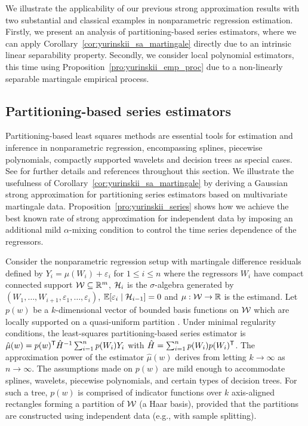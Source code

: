 We illustrate the applicability of our previous strong approximation results
with two substantial and classical examples in nonparametric regression
estimation. Firstly, we present an analysis of partitioning-based series
estimators, where we can apply Corollary~\ref{cor:yurinskii_sa_martingale}
directly due to an intrinsic linear separability property. Secondly, we
consider local polynomial estimators, this time using
Proposition~\ref{pro:yurinskii_emp_proc} due to a non-linearly separable
martingale empirical process.

\subsection{Partitioning-based series estimators}
\label{sec:yurinskii_series}

Partitioning-based least squares methods are essential tools for estimation and
inference in nonparametric regression, encompassing splines, piecewise
polynomials, compactly supported wavelets and decision trees as special cases.
See \citet{cattaneo2020large} for further details and references throughout
this section. We illustrate the usefulness of
Corollary~\ref{cor:yurinskii_sa_martingale}
by deriving a Gaussian strong approximation for partitioning series estimators
based on multivariate martingale data. Proposition~\ref{pro:yurinskii_series}
shows how
we achieve the best known rate of strong approximation for independent data by
imposing an additional mild $\alpha$-mixing condition to control the time
series dependence of the regressors.

Consider the nonparametric regression setup with martingale difference
residuals defined by $Y_i = \mu(W_i) + \varepsilon_i$ for $ 1 \leq i \leq n$
where the regressors $W_i$ have compact connected support $\mathcal{W} \subseteq \mathbb{R}^m$,
$\mathcal{H}_i$ is the $\sigma$-algebra generated by
$(W_1, \ldots, W_{i+1}, \varepsilon_1, \ldots, \varepsilon_i)$,
$\mathbb{E}[\varepsilon_i \mid \mathcal{H}_{i-1}] = 0$ and $\mu: \mathcal{W} \to \mathbb{R}$ is the estimand.
Let $p(w)$ be a $k$-dimensional vector of bounded basis functions on $\mathcal{W}$
which are locally supported on a quasi-uniform partition
\citep[Assumption~2]{cattaneo2020large}. Under minimal regularity conditions,
the least-squares partitioning-based series estimator is
$\hat\mu(w) = p(w)^{\mathsf{T}} \hat H^{-1} \sum_{i=1}^n p(W_i) Y_i$
with $\hat H = \sum_{i=1}^n p(W_i) p(W_i)^{\mathsf{T}}$.
The approximation power of the estimator $\hat\mu(w)$ derives from letting
$k\to\infty$ as $n\to\infty$. The assumptions made on $p(w)$ are mild enough to
accommodate splines, wavelets, piecewise polynomials, and certain types of
decision trees. For such a tree, $p(w)$ is comprised of indicator functions
over $k$ axis-aligned rectangles forming a partition of $\mathcal{W}$ (a Haar basis),
provided that the partitions are constructed using independent data
(e.g., with sample splitting).

